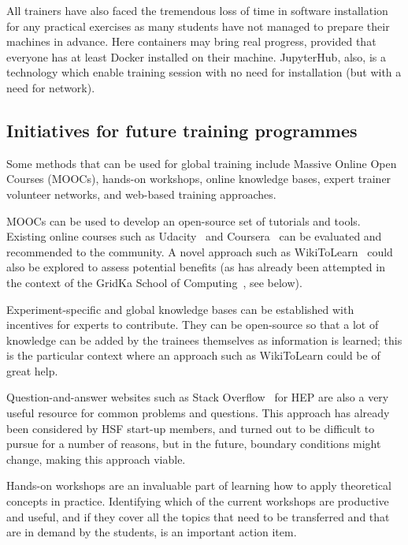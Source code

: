\documentclass[12pt,a4paper]{article}
\begin{document}
All trainers have also faced the tremendous loss of time
in software installation for any practical exercises as many students have
not managed to prepare their machines in advance.
Here containers may bring real
progress, provided that everyone has at least Docker installed on their machine.
JupyterHub, also, is a technology which enable training session with
no need for installation (but with a need for network).

\subsection{Initiatives for future training programmes\label{sec:initiatives}} 

Some methods that can be used for global training include Massive Online Open
Courses (MOOCs), hands-on workshops, online knowledge bases, expert trainer volunteer
networks, and web-based training approaches.

MOOCs can be used to develop an open-source set of
tutorials and tools. Existing online courses such as Udacity~\cite{Udacity} and 
Coursera~\cite{Coursera} can be
evaluated and recommended to the community. A novel approach such as WikiToLearn~\cite{WikiToLearn}
could also be explored to assess potential benefits (as has already been attempted
in the context of the GridKa School of Computing~\cite{GridKa}, see below).

Experiment-specific and global knowledge bases can be established with
incentives for experts to contribute. They can be open-source so that a lot of
knowledge can be added by the trainees themselves as information is learned;
this is the particular context where an approach such as WikiToLearn could be
of great help.

Question-and-answer websites such as Stack Overflow~\cite{Stackoverflow} for HEP are also a very
useful resource for common problems and questions. This approach has already
been considered by HSF start-up members, and turned out to be difficult to
pursue for a number of reasons, but in the future, boundary conditions might
change, making this approach viable.

Hands-on workshops are an invaluable part of learning how to apply theoretical
concepts in practice. Identifying which of the current workshops are productive
and useful, and if they cover all the topics that need to be transferred and
that are in demand by the students, is an important action item.
\end{document}
